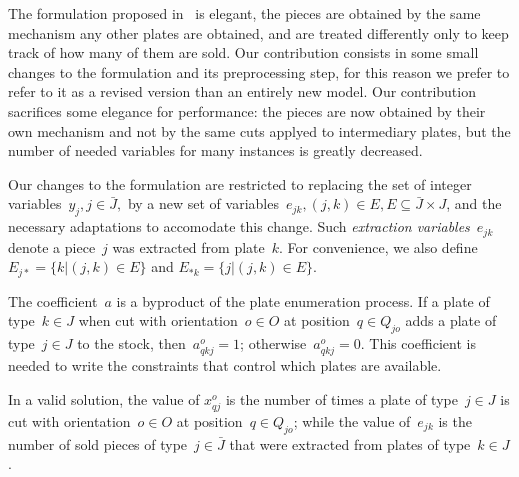 \documentclass[runningheads]{llncs}
\begin{document}
The formulation proposed in~\cite{furini:2016} is elegant, the pieces are obtained by the same mechanism any other plates are obtained, and are treated differently only to keep track of how many of them are sold.
Our contribution consists in some small changes to the formulation and its preprocessing step, for this reason we prefer to refer to it as a revised version than an entirely new model.
Our contribution sacrifices some elegance for performance: the pieces are now obtained by their own mechanism and not by the same cuts applyed to intermediary plates, but the number of needed variables for many instances is greatly decreased.


Our changes to the formulation are restricted to replacing the set of integer variables~\(y_j, j \in \bar{J},\) by a new set of variables~\(e_{jk}, (j, k) \in E, E \subseteq \bar{J} \times J\), and the necessary adaptations to accomodate this change.
Such \emph{extraction variables}~\(e_{jk}\) denote a piece~\(j\) was extracted from plate~\(k\).
For convenience, we also define \(E_{j*} = \{ k | (j, k) \in E \}\) and \(E_{*k} = \{ j | (j, k) \in E \}\).

The coefficient~\(a\) is a byproduct of the plate enumeration process. If a plate of type~\(k \in J\) when cut with orientation~\(o \in O\) at position~\(q \in Q_{jo}\) adds a plate of type~\(j \in J\) to the stock, then~\(a^o_{qkj} = 1\); otherwise~\(a^o_{qkj} = 0\). This coefficient is needed to write the constraints that control which plates are available.

In a valid solution, the value of \(x^o_{qj}\) is the number of times a plate of type~\(j \in J\) is cut with orientation~\(o \in O\) at position~\(q \in Q_{jo}\); while the value of~\(e_{jk}\) is the number of sold pieces of type~\(j \in \bar{J}\) that were extracted from plates of type~\(k \in J\).
\end{document}
